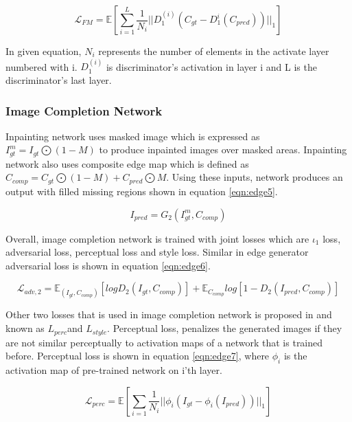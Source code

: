 \begin{equation}
\label{eqn:edge4}
    \mathcal{L}_{FM} = \mathbb{E} [ \sum\limits^L_{i=1}{\frac{1}{N_i}|| D_1^(i) (C_{gt}-D_1^{i} (C_{pred})) ||_1} ]
\end{equation}

In given equation, \(N_i\) represents the number of elements in the activate layer numbered with i. \(D_1^{(i)} \) is discriminator’s activation in layer i and L is the discriminator’s last layer.

\subsubsection{Image Completion Network}

Inpainting network uses masked image which is expressed as  \(I^m_{gt}=I_{gt} \bigodot(1-M)\) to produce inpainted images over masked areas. Inpainting network also uses composite edge map which is defined as \(C_{comp}=C_{gt}  \bigodot (1-M)+C_{pred}  \bigodot M.\) Using these inputs, network produces an output with filled missing regions shown in equation \ref{eqn:edge5}.

\begin{equation}
\label{eqn:edge5}
    I_{pred} = G_2 (I^m_{gt}, C_{comp})
\end{equation}

Overall, image completion network is trained with joint losses which are \(\iota_1\) loss, adversarial loss, perceptual loss and style loss. Similar in edge generator adversarial loss is shown in equation \ref{eqn:edge6}. 

\begin{equation}
\label{eqn:edge6}
    \mathcal{L}_{adv,2} = \mathbb{E}_{(I_{gt},C_{comp})}[logD_{2}(I_{gt},C_{comp})]+\mathbb{E}_{C_{comp}}log[1-D_{2} (I_{pred}, C_{comp})]
\end{equation}

Other two losses that is used in image completion network is proposed in \cite{style} and \cite{perceptual} known as \(L_{perc}\)\space and \space \(L_{style}\).  Perceptual loss, penalizes the generated images if they are not similar perceptually to activation maps of a network that is trained before. Perceptual loss is shown in equation \ref{eqn:edge7}, where \(\phi_i\) is the activation map of pre-trained network on i’th layer.

\begin{equation}
\label{eqn:edge7}
    \mathcal{L}_{perc} = \mathbb{E}[ \sum\limits_{i=1}\frac{1}{N_i} || \phi_i(I_{gt}-\phi_i (I_{pred}) ) ||_1 ]
\end{equation}

